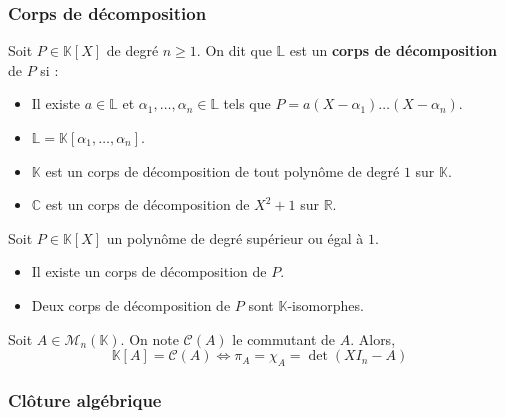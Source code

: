   \subsubsection{Corps de décomposition}

  \begin{definition}
    Soit $P \in \mathbb{K}[X]$ de degré $n \geq 1$. On dit que $\mathbb{L}$ est un \textbf{corps de décomposition} de $P$ si :
    \begin{itemize}
      \item Il existe $a \in \mathbb{L}$ et $\alpha_1, \dots, \alpha_n \in \mathbb{L}$ tels que $P = a(X-\alpha_1) \dots (X-\alpha_n)$.
      \item $\mathbb{L} = \mathbb{K}[\alpha_1, \dots, \alpha_n]$.
    \end{itemize}
  \end{definition}

  \begin{example}
    \begin{itemize}
      \item $\mathbb{K}$ est un corps de décomposition de tout polynôme de degré $1$ sur $\mathbb{K}$.
      \item $\mathbb{C}$ est un corps de décomposition de $X^2+1$ sur $\mathbb{R}$.
    \end{itemize}
  \end{example}

  \begin{theorem}
    Soit $P \in \mathbb{K}[X]$ un polynôme de degré supérieur ou égal à $1$.
    \begin{itemize}
      \item Il existe un corps de décomposition de $P$.
      \item Deux corps de décomposition de $P$ sont $\mathbb{K}$-isomorphes.
    \end{itemize}
  \end{theorem}


  \begin{application}
    Soit $A \in \mathcal{M}_n(\mathbb{K})$. On note $\mathcal{C}(A)$ le commutant de $A$. Alors,
    \[ \mathbb{K}[A] = \mathcal{C}(A) \iff \pi_A = \chi_A = \det(XI_n - A) \]
  \end{application}

  \subsubsection{Clôture algébrique}

